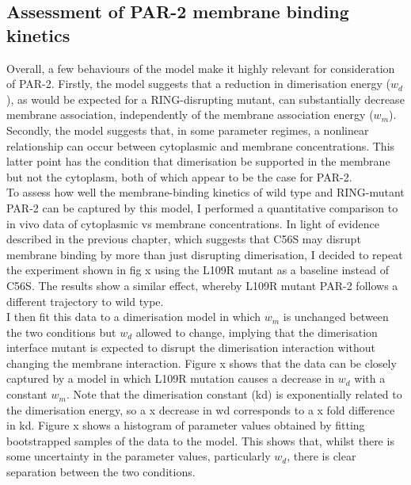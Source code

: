 \documentclass[12pt]{"article"}
\begin{document}
\clearpage
\subsection{Assessment of PAR-2 membrane binding kinetics}

Overall, a few behaviours of the model make it highly relevant for consideration of PAR-2. Firstly, the model suggests that a reduction in dimerisation energy ($w_d$), as would be expected for a RING-disrupting mutant, can substantially decrease membrane association, independently of the membrane association energy ($w_m$). Secondly, the model suggests that, in some parameter regimes, a nonlinear relationship can occur between cytoplasmic and membrane concentrations. This latter point has the condition that dimerisation be supported in the membrane but not the cytoplasm, both of which appear to be the case for PAR-2.\\

To assess how well the membrane-binding kinetics of wild type and RING-mutant PAR-2 can be captured by this model, I performed a quantitative comparison to in vivo data of cytoplasmic vs membrane concentrations. In light of evidence described in the previous chapter, which suggests that C56S may disrupt membrane binding by more than just disrupting dimerisation, I decided to repeat the experiment shown in fig x using the L109R mutant as a baseline instead of C56S. The results show a similar effect, whereby L109R mutant PAR-2 follows a different trajectory to wild type.\\

I then fit this data to a dimerisation model in which $w_m$ is unchanged between the two conditions but $w_d$ allowed to change, implying that the dimerisation interface mutant is expected to disrupt the dimerisation interaction without changing the membrane interaction. Figure x shows that the data can be closely captured by a model in which L109R mutation causes a decrease in $w_d$ with a constant $w_m$. Note that the dimerisation constant (kd) is exponentially related to the dimerisation energy, so a x decrease in wd corresponds to a x fold difference in kd. Figure x shows a histogram of parameter values obtained by fitting bootstrapped samples of the data to the model. This shows that, whilst there is some uncertainty in the parameter values, particularly $w_d$, there is clear separation between the two conditions.\\
\end{document}
